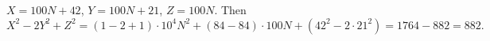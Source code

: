 $X=100N+42$, $Y=100N+21$, $Z=100N$. Then
\[X^2-2Y^2+Z^2=(1-2+1)\cdot10^4N^2+(84-84)\cdot100N+\left(42^2-2\cdot21^2\right)=1764-882=\boxed{882}.\]

